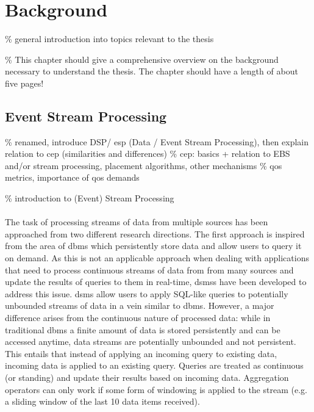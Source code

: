 \chapter{Background}
\% general introduction into topics relevant to the thesis

\% This chapter should give a comprehensive overview on the background necessary to understand the thesis. The chapter should have a length of about five pages!

\section{Event Stream Processing}
\% renamed, introduce DSP/ \gls{esp} (Data / Event Stream Processing), then explain relation to \gls{cep} (similarities and differences)   
\% \gls{cep}: basics + relation to EBS and/or stream processing, placement algorithms, other mechanisms
\% \gls{qos} metrics, importance of \gls{qos} demands  


\% introduction to (Event) Stream Processing \\ \\

The task of processing streams of data from multiple sources has been approached from two different research directions. The first approach is inspired from the area of \Gls{dbms} which persistently store data and allow users to query it on demand. As this is not an applicable approach when dealing with applications that need to process continuous streams of data from from many sources and update the results of queries to them in real-time, \glspl{dsms} have been developed to address this issue. \gls{dsms} allow users to apply SQL-like queries to potentially unbounded streams of data in a vein similar to \gls{dbms}. However, a major difference arises from the continuous nature of processed data: while in traditional \gls{dbms} a finite amount of data is stored persistently and can be accessed anytime, data streams are potentially unbounded and not persistent. This entails that instead of applying an incoming query to existing data, incoming data is applied to an existing query. Queries are treated as continuous (or standing) and update their results based on incoming data. 
Aggregation operators can only work if some form of windowing is applied to the stream (e.g. a sliding window of the last 10 data items received).



